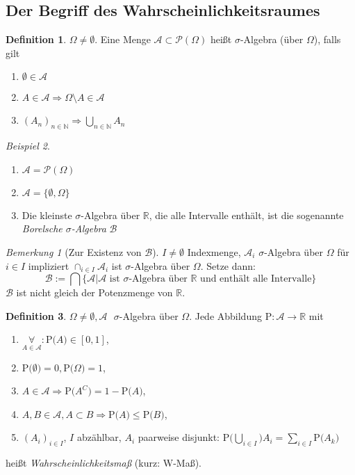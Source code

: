 \documentclass[a4paper,12pt,fleqn]{scrartcl}
\newcommand{\N}{\mathbb{N}}
\newcommand{\R}{\mathbb{R}}
\newcommand{\m}[1]{\mathcal{ #1 }}
\newcommand{\prob}[1]{\text{P(} #1 \text{)}}
\newcommand{\impl}{\Rightarrow}
\newcommand{\fa}[1]{\mathop{\forall}\limits_{#1}}
\theoremstyle{definition}
\newtheorem{definition}{Definition}[section]
\theoremstyle{plain}
\theoremstyle{remark}
\newtheorem*{bemerkung}{Bemerkung}
\newtheorem{beispiel}[definition]{Beispiel}
\begin{document}
\subsection{Der Begriff des Wahrscheinlichkeitsraumes}
\begin{definition}
$\Omega\neq\emptyset$. Eine Menge $\m{A}\subset\m{P}(\Omega)$  heißt $\sigma$-Algebra (über $\Omega$), falls gilt
\begin{enumerate}
\item $\emptyset\in\m{A}$
\item $A\in\m{A}\impl \Omega\setminus A\in\m{A}$
\item $(A_n)_{n\in\N}\impl\bigcup_{n\in\N}A_n$
\end{enumerate}
\end{definition}
\begin{beispiel}
\begin{enumerate}[a]
\item $\m{A}=\m{P}(\Omega)$
\item $\m{A}=\{\emptyset,\Omega\}$
\item Die kleinste $\sigma$-Algebra über $\R$, die alle Intervalle enthält, ist die sogenannte \emph{Borelsche $\sigma$-Algebra} $\m{B}$
\end{enumerate}
\end{beispiel}
\begin{bemerkung}[Zur Existenz von $\m{B}$]
$I\neq\emptyset$ Indexmenge, $\m{A}_i$ $\sigma$-Algebra über $\Omega$ für $i\in I$ impliziert $\cap_{i\in I}\m{A}_i$ ist $\sigma$-Algebra über $\Omega$. Setze dann:
\[\m{B}:=\bigcap\{\m{A}|\m{A}\text{ ist }\sigma\text{-Algebra über }\R\text{ und enthält alle Intervalle}\}\]
$\m{B}$ ist nicht gleich der Potenzmenge von $\R$.
\end{bemerkung}
\begin{definition}
$\Omega\neq\emptyset,\m{A} \text{ } \sigma$-Algebra über $\Omega$. Jede Abbildung $\text{P}:\m{A}\to\R$ mit
\begin{enumerate}[i]
\item $\fa{A\in\m{A}}:\prob{A}\in\left[ 0,1\right]$,
\item $\prob{\emptyset}=0,\prob{\Omega}=1$,
\item $A\in\m{A}\impl \prob{A^C}=1-\prob{A}$,
\item $A,B\in\m{A},A\subset B\impl \prob{A}\leq \prob{B}$,
\item $(A_i)_{i\in I}$, $I$ abzählbar, $A_i$ paarweise disjunkt: $\prob{\bigcup_{i\in I}} A_i=\sum_{i\in I}\prob{A_k}$
\end{enumerate}
heißt \emph{Wahrscheinlichkeitsmaß} (kurz: W-Maß).
\end{definition}
\end{document}
